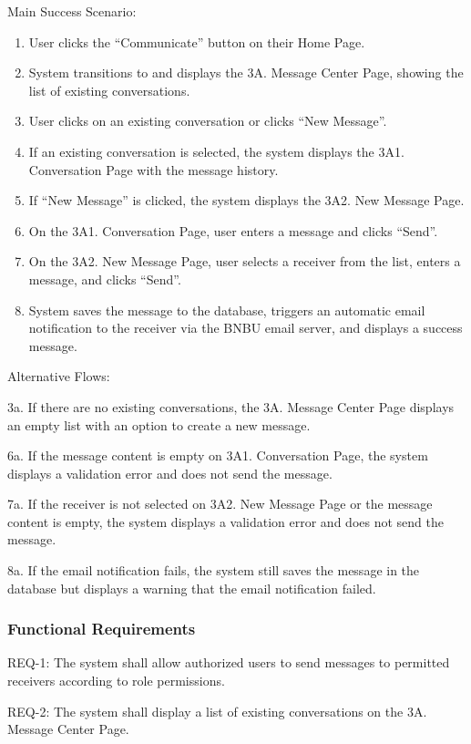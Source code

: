 Main Success Scenario:
\begin{enumerate}
\item User clicks the ``Communicate'' button on their Home Page.
\item System transitions to and displays the 3A. Message Center Page, showing the list of existing conversations.
\item User clicks on an existing conversation or clicks ``New Message''.
\item If an existing conversation is selected, the system displays the 3A1. Conversation Page with the message history.
\item If ``New Message'' is clicked, the system displays the 3A2. New Message Page.
\item On the 3A1. Conversation Page, user enters a message and clicks ``Send''.
\item On the 3A2. New Message Page, user selects a receiver from the list, enters a message, and clicks ``Send''.
\item System saves the message to the database, triggers an automatic email notification to the receiver via the BNBU email server, and displays a success message.
\end{enumerate}

Alternative Flows:

3a. If there are no existing conversations, the 3A. Message Center Page displays an empty list with an option to create a new message.

6a. If the message content is empty on 3A1. Conversation Page, the system displays a validation error and does not send the message.

7a. If the receiver is not selected on 3A2. New Message Page or the message content is empty, the system displays a validation error and does not send the message.

8a. If the email notification fails, the system still saves the message in the database but displays a warning that the email notification failed.

\subsubsection{Functional Requirements}

REQ-1: The system shall allow authorized users to send messages to permitted receivers according to role permissions.

REQ-2: The system shall display a list of existing conversations on the 3A. Message Center Page.


